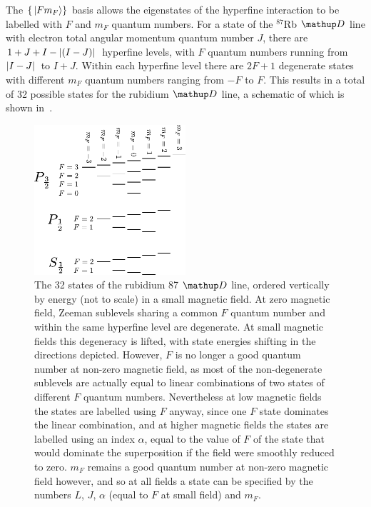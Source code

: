 The $\{\ket{F m_F}\}$ basis allows the eigenstates of the hyperfine interaction to be labelled with $F$ and $m_F$ quantum numbers. For a state of the $^{87}$Rb $\up{D}$ line with electron total angular momentum quantum number $J$, there are $1+J+I - \abs{(I - J)}$ hyperfine levels, with $F$ quantum numbers running from $\abs{I - J}$ to $I + J$. Within each hyperfine level there are $2F + 1$ degenerate states with different $m_F$ quantum numbers ranging from $-F$ to $F$. This results in a total of 32 possible states for the rubidium $\up{D}$ line, a schematic of which is shown in~.

\begin{figure}%
\begin{center}
\includegraphics[width=0.5\textwidth]{figures/atomic_physics/D_line.pdf}
\caption{The 32 states of the rubidium 87 $\up{D}$ line, ordered vertically by energy (not to scale) in a small magnetic field. At zero magnetic field, Zeeman sublevels sharing a common $F$ quantum number and within the same hyperfine level are degenerate. At small magnetic fields this degeneracy is lifted, with state energies shifting in the directions depicted. However, $F$ is no longer a good quantum number at non-zero magnetic field, as most of the non-degenerate sublevels are actually equal to linear combinations of two states of different $F$ quantum numbers. Nevertheless at low magnetic fields the states are labelled using $F$ anyway, since one $F$ state dominates the linear combination, and at higher magnetic fields the states are labelled using an index $\alpha$, equal to the value of $F$ of the state that would dominate the superposition if the field were smoothly reduced to zero. $m_F$ remains a good quantum number at non-zero magnetic field however, and so at all fields a state can be specified by the numbers $L$, $J$, $\alpha$ (equal to $F$ at small field) and $m_F$.} \label{fig:D_line}
\end{center}
\end{figure}

